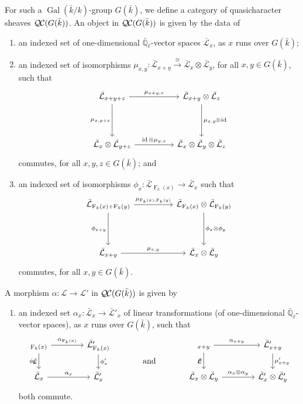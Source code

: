 \documentclass[11pt]{amsart}
\makeatletter
\theoremstyle{plain}
\theoremstyle{definition}
\theoremstyle{remark}
\newcommand{\EE}{\mathbb{\bar Q}_\ell}
\newcommand{\bFq}{\bar{k}}
\newcommand{\Fq}{k}
\DeclareMathOperator{\Gal}{Gal}
\newcommand{\Frob}[1]{{\operatorname{F}_{#1}}}
\DeclareMathOperator{\id}{id}
\newcommand{\iso}{{\ \cong\ }}
\newcommand{\cs}[1]{{\mathcal{#1}}}
\newcommand{\gcs}[1]{{\mathcal{\bar #1}}}
\newcommand{\QC}{{\mathcal{Q\hskip-0.8pt C}}}
\newcommand{\labitem}[2]{%
\def\@itemlabel{\textbf{#1}}
\item
\def\@currentlabel{#1}\label{#2}}
\newcommand{\tight}[3]{\hspace{-#1pt}{#2}\hspace{-#3pt}}
\newcommand\Clifton[1]{\marginpar{\smaller\smaller CC: #1}}
\makeatother
\begin{document}
For such a $\Gal(\bFq/\Fq)$-group $G(\bFq)$, 
\Clifton{Re-phrase.}
we define a category of quasicharacter sheaves $\QC(G(\bFq))$.
An object in $\QC(G(\bFq))$ is given by the data of
\begin{enumerate}
 \labitem{(cs.0)}{cs.0} an indexed set of one-dimensional
  $\EE$-vector spaces $\gcs{L}_x$, as $x$ runs over
  $G(\bFq)$;

 \labitem{(cs.1)}{cs.1} an indexed set of isomorphisms
  $\mu_{x,y} : \gcs{L}_{x+y} \mathop{\longrightarrow}\limits^{\iso} \gcs{L}_{x} \otimes \gcs{L}_{y}$,
  for all $x,y \in G(\bFq)$, such that
  \[
   \begin{tikzcd}[row sep=40]
    \gcs{L}_{x+y+z} \arrow{rr}{\mu_{x+y,z}} \arrow[swap]{d}{\mu_{x,y+z}}
    && \gcs{L}_{x+y}\otimes \gcs{L}_{z} \dar{\mu_{x,y} \tight{0.5}{\otimes}{1} \id} \\
    \gcs{L}_{x} \otimes \gcs{L}_{y+z} \arrow{rr}{\id \otimes \mu_{y,z}}
    && \gcs{L}_{x} \otimes\gcs{L}_{y} \otimes \gcs{L}_{z}
   \end{tikzcd}
  \]
  commutes, for all $x,y,z\in G(\bFq)$; and

 \labitem{(cs.2)}{cs.2} an indexed set of isomorphisms $\phi_{x} : \gcs{L}_{\Frob{\Fq}(x)} \to \gcs{L}_x$
  such that
  \[
   \begin{tikzcd}[row sep=40]
    \gcs{L}_{\Frob{\Fq}(x)+\Frob{\Fq}(y)} \arrow[swap]{d}{\phi_{x+y}} \arrow{rr}{\mu_{\Frob{\Fq}(x),\Frob{\Fq}(y)}}
    && \gcs{L}_{\Frob{\Fq}(x)}\otimes \gcs{L}_{\Frob{\Fq}(y)} \dar{\phi_x \tight{0}{\otimes}{0} \phi_y} \\
    \gcs{L}_{x+y} \arrow{rr}{\mu_{x,y}}
    && \gcs{L}_x \otimes\gcs{L}_y
   \end{tikzcd}
  \]
  commutes, for all $x,y\in G(\bFq)$.
\end{enumerate}
A morphism $\alpha : \cs{L} \to \cs{L'}$ in $\QC(G(\bFq))$ is given by 
\begin{enumerate}
 \labitem{(cs.3)}{cs.3} an indexed set $\alpha_x : \gcs{L}_x \to \gcs{L'}_x$
  of linear transformations (of one-dimensional $\EE$-vector spaces),
  as $x$ runs over $G(\bFq)$, such that
  \[
   \begin{tikzcd}[column sep=40]
    \arrow[swap]{d}{\phi_x} \gcs{L}_{\Frob{\Fq}(x)} \rar{\alpha_{\Frob{\Fq}(x)}} & \gcs{L'}_{\Frob{\Fq}(x)} \dar{\phi_x'}
    &\arrow[draw=none]{d}[pos=.4,description]{\text{\normalsize{and}}}& \arrow[swap]{d}{\mu} \gcs{L}_{x+y} \rar{\alpha_{x+y}} & \gcs{L'}_{x+y} \dar{\mu'_{x+y}} \\
    \gcs{L}_x \rar{\alpha_x} & \gcs{L'}_x
    & {} & \gcs{L}_x\otimes\gcs{L}_y \rar{\alpha_x\otimes \alpha_y} & \gcs{L'}_x \otimes \gcs{L'}_y
   \end{tikzcd}
  \]
  both commute.
\end{enumerate}
\end{document}
